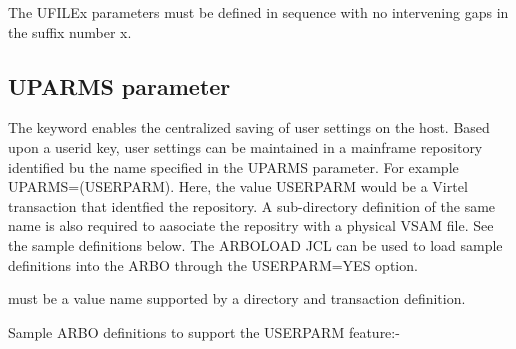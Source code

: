 \documentclass[letterpaper,10pt,english]{sphinxmanual}
\begin{document}
The UFILEx parameters must be defined in sequence with no intervening gaps in the suffix number x.

\ignorespaces 

\subsection{UPARMS parameter}
\label{\detokenize{Installation_Guide:uparms-parameter}}\label{\detokenize{Installation_Guide:index-134}}
The keyword enables the centralized saving of user settings on the host. Based upon a userid key, user settings can be maintained in a mainframe repository identified bu the name specified in the UPARMS parameter. For example UPARMS=(USERPARM). Here, the value USERPARM would be a Virtel transaction that identfied the repository. A sub-directory definition of the same name is also required to aasociate the repositry with a physical VSAM file. See the sample definitions below. The ARBOLOAD JCL can be used to load sample definitions into the ARBO through the USERPARM=YES option.

\begin{sphinxVerbatim}[commandchars=\\\{\}]
\end{sphinxVerbatim}

 must be a value name supported by a directory and transaction definition.

Sample ARBO definitions to support the USERPARM feature:-
\end{document}
